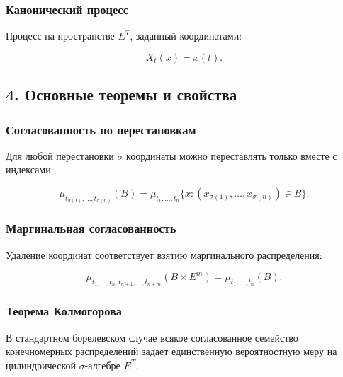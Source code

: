 \documentclass[
  11pt,
  a4paper,
]{article}
\begin{document}
\subsubsection{Канонический
процесс}\label{ux43aux430ux43dux43eux43dux438ux447ux435ux441ux43aux438ux439-ux43fux440ux43eux446ux435ux441ux441}

Процесс на пространстве \(E^T\), заданный координатами:

\[
X_t(x)=x(t).
\]

\subsection{4. Основные теоремы и
свойства}\label{ux43eux441ux43dux43eux432ux43dux44bux435-ux442ux435ux43eux440ux435ux43cux44b-ux438-ux441ux432ux43eux439ux441ux442ux432ux430}

\subsubsection{Согласованность по
перестановкам}\label{ux441ux43eux433ux43bux430ux441ux43eux432ux430ux43dux43dux43eux441ux442ux44c-ux43fux43e-ux43fux435ux440ux435ux441ux442ux430ux43dux43eux432ux43aux430ux43c}

Для любой перестановки \(\sigma\) координаты можно переставлять только
вместе с индексами:

\[
\mu_{t_{\sigma(1)},\ldots,t_{\sigma(n)}}(B)
=
\mu_{t_1,\ldots,t_n}
\{x:(x_{\sigma(1)},\ldots,x_{\sigma(n)})\in B\}.
\]

\subsubsection{Маргинальная
согласованность}\label{ux43cux430ux440ux433ux438ux43dux430ux43bux44cux43dux430ux44f-ux441ux43eux433ux43bux430ux441ux43eux432ux430ux43dux43dux43eux441ux442ux44c}

Удаление координат соответствует взятию маргинального распределения:

\[
\mu_{t_1,\ldots,t_n,t_{n+1},\ldots,t_{n+m}}
(B\times E^m)
=
\mu_{t_1,\ldots,t_n}(B).
\]

\subsubsection{Теорема
Колмогорова}\label{ux442ux435ux43eux440ux435ux43cux430-ux43aux43eux43bux43cux43eux433ux43eux440ux43eux432ux430-1}

В стандартном борелевском случае всякое согласованное семейство
конечномерных распределений задает единственную вероятностную меру на
цилиндрической \(\sigma\)-алгебре \(E^T\).
\end{document}
